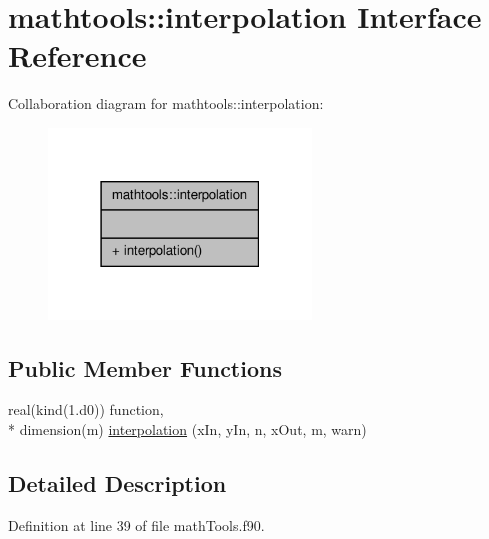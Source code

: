 \hypertarget{interfacemathtools_1_1interpolation}{\section{mathtools\-:\-:interpolation Interface Reference}
\label{interfacemathtools_1_1interpolation}
}


Collaboration diagram for mathtools\-:\-:interpolation\-:\nopagebreak
\begin{figure}[H]
\begin{center}
\leavevmode
\includegraphics[width=198pt]{interfacemathtools_1_1interpolation__coll__graph}
\end{center}
\end{figure}
\subsection*{Public Member Functions}
\begin{DoxyCompactItemize}
\item 
real(kind(1.d0)) function, \\*
dimension(m) \hyperlink{interfacemathtools_1_1interpolation_aa34b2fd6d7e39693e1e649c213ae000d}{interpolation} (x\-In, y\-In, n, x\-Out, m, warn)
\end{DoxyCompactItemize}


\subsection{Detailed Description}


Definition at line 39 of file math\-Tools.\-f90.



